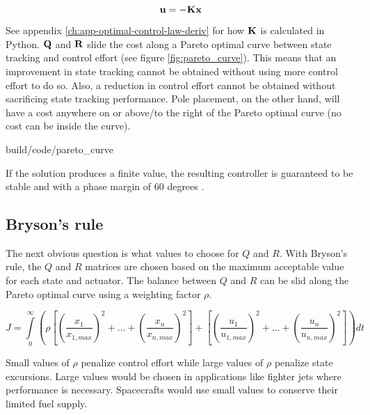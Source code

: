 \begin{equation*}
  \mathbf{u} = -\mathbf{K}\mathbf{x}
\end{equation*}

See appendix \ref{ch:app-optimal-control-law-deriv} for how $\mathbf{K}$ is
calculated in Python. $\mathbf{Q}$ and $\mathbf{R}$ slide the cost along a Pareto
optimal curve between state tracking and control effort (see figure
\ref{fig:pareto_curve}). This means that an improvement in state tracking cannot
be obtained without using more control effort to do so. Also, a reduction in
control effort cannot be obtained without sacrificing state tracking
performance. Pole placement, on the other hand, will have a cost anywhere on or
above/to the right of the Pareto optimal curve (no cost can be inside the
curve).

\begin{svg}{build/code/pareto_curve}
  \caption{Pareto optimal curve for LQR}
  \label{fig:pareto_curve}
\end{svg}

If the solution produces a finite value, the resulting controller is guaranteed
to be stable and  with a \gls{phase margin} of 60
degrees \cite{bib:lqr-phase-margin}.

\subsection{Bryson's rule}

The next obvious question is what values to choose for $Q$ and $R$. With
Bryson's rule, the $Q$ and $R$ matrices are chosen based on the maximum
acceptable value for each \gls{state} and actuator. The balance between $Q$ and
$R$ can be slid along the Pareto optimal curve using a weighting factor $\rho$.

\begin{equation*}
  J = \int\limits_0^\infty \left(\rho \left[
    \left(\frac{x_1}{x_{1,max}}\right)^2 + \ldots +
    \left(\frac{x_n}{x_{n,max}}\right)^2\right] + \left[
    \left(\frac{u_1}{u_{1,max}}\right)^2 + \ldots +
    \left(\frac{u_n}{u_{n,max}}\right)^2\right]\right) dt
\end{equation*}

Small values of $\rho$ penalize control effort while large values of $\rho$
penalize \gls{state} excursions. Large values would be chosen in applications
like fighter jets where performance is necessary. Spacecrafts would use small
values to conserve their limited fuel supply.

